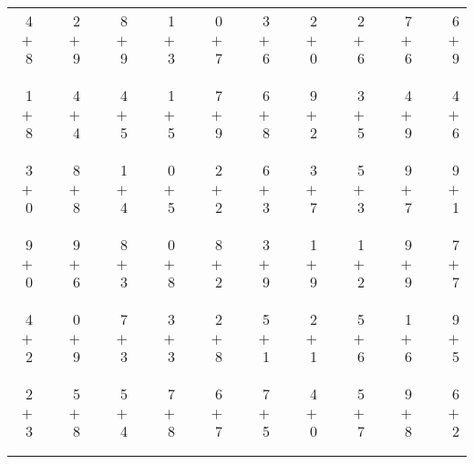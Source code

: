 \documentclass[12pt, letterpaper]{article}
\begin{document}
\begin{tabular}{rrrrrrrrrrrrrrrrrrr}
4 & & 2 & & 8 & & 1 & & 0 & & 3 & & 2 & & 2 & & 7 & & 6\\
$+$ 8 & & $+$ 9 & & $+$ 9 & & $+$ 3 & & $+$ 7 & & $+$ 6 & & $+$ 0 & & $+$ 6 & & $+$ 6 & & $+$ 9\\
\cline{1-1} \cline{3-3} \cline{5-5} \cline{7-7} \cline{9-9} \cline{11-11} \cline{13-13} \cline{15-15} \cline{17-17} \cline{19-19} \\ \\
1 & & 4 & & 4 & & 1 & & 7 & & 6 & & 9 & & 3 & & 4 & & 4\\
$+$ 8 & & $+$ 4 & & $+$ 5 & & $+$ 5 & & $+$ 9 & & $+$ 8 & & $+$ 2 & & $+$ 5 & & $+$ 9 & & $+$ 6\\
\cline{1-1} \cline{3-3} \cline{5-5} \cline{7-7} \cline{9-9} \cline{11-11} \cline{13-13} \cline{15-15} \cline{17-17} \cline{19-19} \\ \\
3 & & 8 & & 1 & & 0 & & 2 & & 6 & & 3 & & 5 & & 9 & & 9\\
$+$ 0 & & $+$ 8 & & $+$ 4 & & $+$ 5 & & $+$ 2 & & $+$ 3 & & $+$ 7 & & $+$ 3 & & $+$ 7 & & $+$ 1\\
\cline{1-1} \cline{3-3} \cline{5-5} \cline{7-7} \cline{9-9} \cline{11-11} \cline{13-13} \cline{15-15} \cline{17-17} \cline{19-19} \\ \\
9 & & 9 & & 8 & & 0 & & 8 & & 3 & & 1 & & 1 & & 9 & & 7\\
$+$ 0 & & $+$ 6 & & $+$ 3 & & $+$ 8 & & $+$ 2 & & $+$ 9 & & $+$ 9 & & $+$ 2 & & $+$ 9 & & $+$ 7\\
\cline{1-1} \cline{3-3} \cline{5-5} \cline{7-7} \cline{9-9} \cline{11-11} \cline{13-13} \cline{15-15} \cline{17-17} \cline{19-19} \\ \\
4 & & 0 & & 7 & & 3 & & 2 & & 5 & & 2 & & 5 & & 1 & & 9\\
$+$ 2 & & $+$ 9 & & $+$ 3 & & $+$ 3 & & $+$ 8 & & $+$ 1 & & $+$ 1 & & $+$ 6 & & $+$ 6 & & $+$ 5\\
\cline{1-1} \cline{3-3} \cline{5-5} \cline{7-7} \cline{9-9} \cline{11-11} \cline{13-13} \cline{15-15} \cline{17-17} \cline{19-19} \\ \\
2 & & 5 & & 5 & & 7 & & 6 & & 7 & & 4 & & 5 & & 9 & & 6\\
$+$ 3 & & $+$ 8 & & $+$ 4 & & $+$ 8 & & $+$ 7 & & $+$ 5 & & $+$ 0 & & $+$ 7 & & $+$ 8 & & $+$ 2\\
\cline{1-1} \cline{3-3} \cline{5-5} \cline{7-7} \cline{9-9} \cline{11-11} \cline{13-13} \cline{15-15} \cline{17-17} \cline{19-19} \\ \\

\end{tabular}
\end{document}
